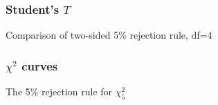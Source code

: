 \documentclass[handout]{beamer}
\begin{document}
   \begin{frame}
   \frametitle{Student's $T$}
   \begin{center}
   \end{center}
   Comparison of two-sided {\color{blue} 5\% rejection rule}, df=4
   \end{frame}



   \begin{frame}
   \frametitle{$\chi^2$ curves}
   \begin{center}
   \end{center}
   The 5\% rejection rule for $\chi^2_5$
   \end{frame}


   \begin{frame} 

   \end{frame}

   
\end{document}
